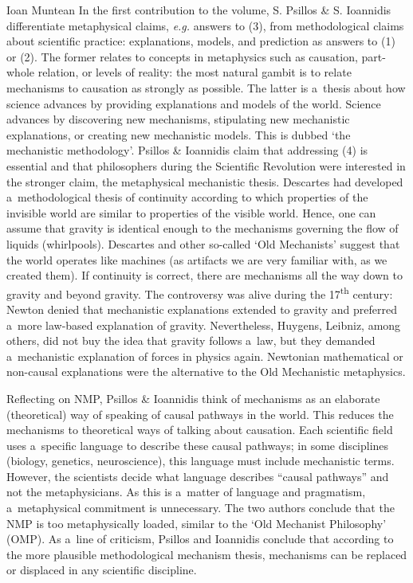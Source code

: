 \begin{recengenv}{Ioan Muntean}
\enlargethispage{1.5\baselineskip}
In the first contribution to the volume, S. Psillos \& S. Ioannidis differentiate metaphysical claims, \textit{e.g.} answers to (3), from methodological claims about scientific practice: explanations, models, and prediction as answers to (1) or (2). The former relates to concepts in metaphysics such as causation, part-whole relation, or levels of reality: the most natural gambit is to relate mechanisms to causation as strongly as possible. The latter is a~thesis about how science advances by providing explanations and models of the world. Science advances by discovering new mechanisms, stipulating new mechanistic explanations, or creating new mechanistic models. This is dubbed ‘the mechanistic methodology'. Psillos \& Ioannidis claim that addressing (4) is essential and that philosophers during the Scientific Revolution were interested in the stronger claim, the metaphysical mechanistic thesis. Descartes had developed a~methodological thesis of continuity according to which properties of the invisible world are similar to properties of the visible world. Hence, one can assume that gravity is identical enough to the mechanisms governing the flow of liquids (whirlpools). Descartes and other so-called ‘Old Mechanists' suggest that the world operates like machines (as artifacts we are very familiar with, as we created them). If continuity is correct, there are mechanisms all the way down to gravity and beyond gravity. The controversy was alive during the 17\textsuperscript{th} century: Newton denied that mechanistic explanations extended to gravity and preferred a~more law-based explanation of gravity. Nevertheless, Huygens, Leibniz, among others, did not buy the idea that gravity follows a~law, but they demanded a~mechanistic explanation of forces in physics again. Newtonian mathematical or non-causal explanations were the alternative to the Old Mechanistic metaphysics.

Reflecting on NMP, Psillos \& Ioannidis think of mechanisms as an elaborate (theoretical) way of speaking of causal pathways in the world. This reduces the mechanisms to theoretical ways of talking about causation. Each scientific field uses a~specific language to describe these causal pathways; in some disciplines (biology, genetics, neuroscience), this language must include mechanistic terms. However, the scientists decide what language describes ``causal pathways'' and not the metaphysicians. As this is a~matter of language and pragmatism, a~metaphysical commitment is unnecessary. The two authors conclude that the NMP is too metaphysically loaded, similar to the ‘Old Mechanist Philosophy' (OMP). As a~line of criticism, Psillos and Ioannidis conclude that according to the more plausible methodological mechanism thesis, mechanisms can be replaced or displaced in any scientific discipline.


\end{recengenv}
